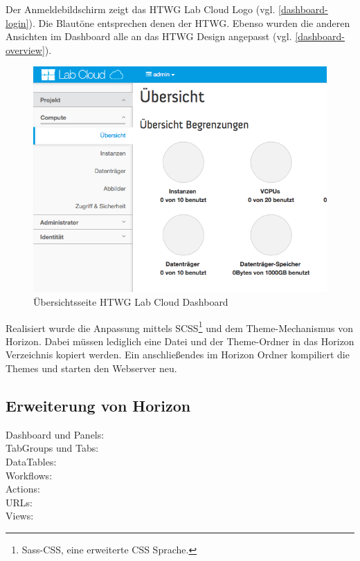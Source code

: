 Der Anmeldebildschirm zeigt das HTWG Lab Cloud Logo (vgl. \autoref{dashboard-login}).
Die Blautöne entsprechen denen der HTWG.
Ebenso wurden die anderen Ansichten im Dashboard alle an das HTWG Design angepasst (vgl. \autoref{dashboard-overview}).

\begin{figure}[htbp]
\centering
\includegraphics[scale=0.6]{img/dashboard-overview.png}
\caption{Übersichtsseite HTWG Lab Cloud Dashboard}
\label{dashboard-overview}
\end{figure}

Realisiert wurde die Anpassung mittels SCSS\footnote{Sass-CSS, eine erweiterte CSS Sprache.} und dem Theme-Mechanismus von Horizon.
Dabei müssen lediglich eine Datei und der  Theme-Ordner in das Horizon Verzeichnis kopiert werden.
Ein anschließendes  im Horizon Ordner kompiliert die Themes und starten den Webserver neu.

\subsection{Erweiterung von Horizon}

\begin{description}
\item[Dashboard und Panels: ]
\item[TabGroups und Tabs: ]
\item[DataTables: ] 
\item[Workflows: ] 
\item[Actions: ] 
\item[URLs: ] 
\item[Views: ] 
\end{description}

